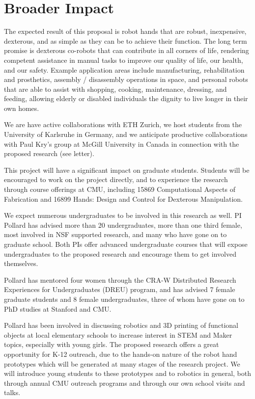 
\section{Broader Impact}

The expected result of this proposal is robot hands that are robust, inexpensive, dexterous, and as simple as they can be to achieve their function.     The long term promise is dexterous co-robots that can contribute in all corners of life, rendering competent assistance in manual tasks to improve our quality of life, our health, and our safety.    Example application areas include manufacturing, rehabilitation and prosthetics, assembly / disassembly operations in space, and personal robots that are able to assist with shopping, cooking, maintenance, dressing, and feeding, allowing elderly or disabled individuals the dignity to live longer in their own homes.

\smallskip{}
We are have active collaborations with ETH Zurich, we host students from the University of Karlsruhe in Germany, and we anticipate productive collaborations with Paul Kry's group at McGill University in Canada in connection with the proposed research (see letter).    

\smallskip{} This project will have a significant impact on graduate students.   Students will be encouraged to work on the project directly, and to experience the research through course offerings at CMU, including 
 15869 Computational Aspects of Fabrication and 16899 Hands: Design and Control for Dexterous Manipulation.  

\smallskip{}   We expect numerous undergraduates to be involved in this research as well.    PI Pollard has advised more than 20 undergraduates, more than one third female, most involved in NSF supported research, and many who have gone on to graduate school.    Both PIs offer advanced undergraduate courses that will expose undergraduates to the proposed research and encourage them to get involved themselves.

\smallskip{}  Pollard has mentored four women through the CRA-W Distributed Research Experiences for Undergraduates (DREU) program, and has advised 7 female graduate students and 8 female undergraduates, three of whom have gone on to PhD studies at Stanford and CMU.

\smallskip{}
Pollard has been involved in discussing robotics and 3D printing of functional objects at local elementary schools to increase interest in STEM and Maker topics, especially with young girls.  The proposed research offers a great opportunity for K-12 outreach, due to the hands-on nature of the robot hand prototypes which will be generated at many stages of the research project.   We will introduce young students to these prototypes and to robotics in general, both through annual CMU outreach programs and through our own school visits and talks.

